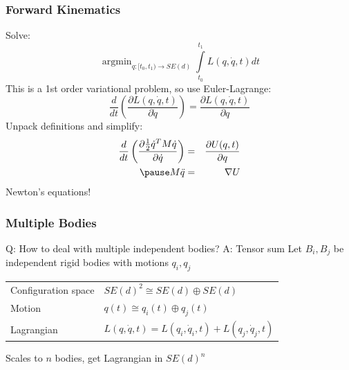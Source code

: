 \documentclass{beamer}
\begin{document}
\begin{frame}
\frametitle{Forward Kinematics}
Solve:
\[ \mathop{\text{argmin}}_{q : [t_0, t_1) \to SE(d)} \int \limits_{t_0}^{t_1} L(q, \dot{q}, t) dt \]
\pause
This is a 1st order variational problem, so use Euler-Lagrange:
\[ \frac{d}{dt} \left ( \frac{\partial L(q, \dot{q}, t)}{\partial \dot{q}} \right) = \frac{\partial L(q, \dot{q}, t)}{\partial q} \]
\pause
Unpack definitions and simplify:
\begin{eqnarray*}
\frac{d}{dt} \left( \frac{\partial \frac{1}{2} \dot{q}^T M \dot{q} }{\partial \dot{q}} \right) & = & \frac{\partial U(q, t)}{\partial q} \\
\pause
M \ddot{q} & = & \nabla U
\end{eqnarray*}
Newton's equations!
\end{frame}

\begin{frame}
\frametitle{Multiple Bodies}
Q: How to deal with multiple independent bodies?
\pause
\vskip5pt
A: Tensor sum
\vskip15pt
Let $B_i, B_j$ be independent rigid bodies with motions $q_i, q_j$
\vskip15pt
\begin{tabular}{ll}
Configuration space & $SE(d)^2 \cong SE(d) \oplus SE(d)$ \\
Motion & $q(t) \cong q_i(t) \oplus q_j(t)$ \\
Lagrangian & $L(q,\dot{q},t) = L(q_i, \dot{q}_i, t) + L(q_j, \dot{q}_j, t)$ \\
\end{tabular}
\pause
\vskip15pt
Scales to $n$ bodies, get Lagrangian in $SE(d)^n$
\end{frame}
\end{document}

